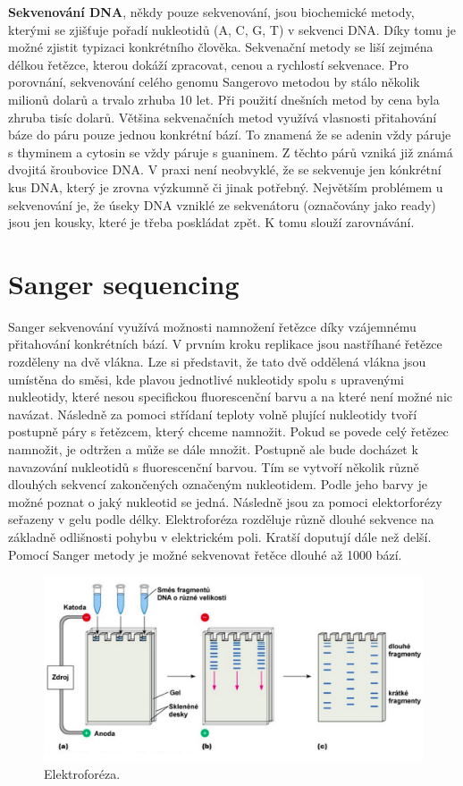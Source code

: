 \documentclass[czech,DP]{thesiskiv}
\numberwithin{equation}{section}
\begin{document}
\noindent
\textbf{Sekvenování DNA}, někdy pouze sekvenování, jsou biochemické metody, kterými se zjišťuje pořadí nukleotidů (A, C, G, T) v sekvenci DNA. Díky tomu je možné zjistit typizaci konkrétního člověka. Sekvenační metody se liší zejména délkou řetězce, kterou dokáží zpracovat, cenou a rychlostí sekvenace. Pro porovnání, sekvenování celého genomu Sangerovo metodou by stálo několik milionů dolarů a trvalo zrhuba 10 let. Při použití dnešních metod by cena byla zhruba tisíc dolarů. Většina sekvenačních metod využívá vlasnosti přitahování báze do páru pouze jednou konkrétní bází. To znamená že se adenin vždy páruje s thyminem a cytosin se vždy páruje s guaninem. Z těchto párů vzniká již známá dvojitá šroubovice DNA. V praxi není neobvyklé, že se sekvenuje jen kónkrétní kus DNA, který je zrovna výzkumně či jinak potřebný. Největším problémem u sekvenování je, že úseky DNA vzniklé ze sekvenátoru (označovány jako ready) jsou jen kousky, které je třeba poskládat zpět. K tomu slouží zarovnávání. \cite{sekvenovani_ziva} 


\section{Sanger sequencing}
Sanger sekvenování využívá možnosti namnožení řetězce díky vzájemnému přitahování konkrétních bází. V prvním kroku replikace jsou nastříhané řetězce rozděleny na dvě vlákna. Lze si představit, že tato dvě oddělená vlákna jsou umístěna do směsi, kde plavou jednotlivé nukleotidy spolu s upravenými nukleotidy, které nesou specifickou fluorescenční barvu a na které není možné nic navázat. Následně za pomoci střídaní teploty volně plující nukleotidy tvoří postupně páry s řetězcem, který chceme namnožit. Pokud se povede celý řetězec namnožit, je odtržen a může se dále množit. Postupně ale bude docházet k navazování nukleotidů s fluorescenční barvou. Tím se vytvoří několik různě dlouhých sekvencí zakončených označeným nukleotidem. Podle jeho barvy je možné poznat o jaký nukleotid se jedná. Následně jsou za pomoci elektorforézy seřazeny v gelu podle délky. Elektroforéza rozděluje různě dlouhé sekvence na základně odlišnosti pohybu v elektrickém poli. Kratší doputují dále než delší. Pomocí Sanger metody je možné sekvenovat řetěce dlouhé až 1000 bází.   

\begin{figure}[H]		
		\centering
		\includegraphics[width=\textwidth]{./img/elektroforeza.png}
		\caption{Elektroforéza. \cite{elektroforeza_img}}
		\label{fig:elektroforeza}
\end{figure}
 
\end{document}
